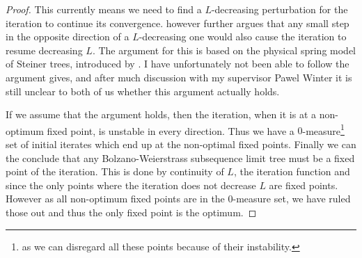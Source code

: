 \begin{proof}
This currently means we need to find a $L$-decreasing perturbation for
the iteration to continue its convergence. \citeauthor{smith1992} however
further argues that any small step in the opposite direction of a $L$-decreasing
one would also cause the iteration to resume decreasing $L$. The argument for
this is based on the physical spring model of Steiner trees, introduced by
\textcite{gilbert1968}. I have unfortunately not been able to follow the
argument \textcite{smith1992} gives, and after much discussion with my
supervisor Pawel Winter it is still unclear to both of us whether this argument
actually holds.

If we assume that the argument holds, then the iteration, when it is at a
non-optimum fixed point, is unstable in every direction. Thus we have a
$0$-measure\footnote{as we can disregard all these points because of their
  instability.} set of initial iterates which end up at the non-optimal fixed
points. Finally we can the conclude that any Bolzano-Weierstrass subsequence
limit tree must be a fixed point of the iteration. This is done by continuity of
$L$, the iteration function and since the only points where the iteration does
not decrease $L$ are fixed points. However as all non-optimum fixed points are
in the 0-measure set, we have ruled those out and thus the only fixed point is
the optimum.
\end{proof}

